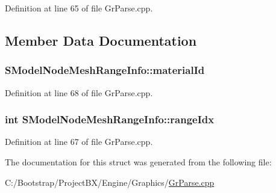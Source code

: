 Definition at line 65 of file GrParse.cpp.

\subsection{Member Data Documentation}
\hypertarget{struct_s_model_node_mesh_range_info_bf16f26b74ad08b098ef75563a1eae90}{
\subsubsection[{materialId}]{ {\bf SModelNodeMeshRangeInfo::materialId}}}
\label{struct_s_model_node_mesh_range_info_bf16f26b74ad08b098ef75563a1eae90}




Definition at line 68 of file GrParse.cpp.\hypertarget{struct_s_model_node_mesh_range_info_1d4582bb5a63563bbf20adf986fd6d04}{
\subsubsection[{rangeIdx}]{\setlength{\rightskip}{0pt plus 5cm}int {\bf SModelNodeMeshRangeInfo::rangeIdx}}}
\label{struct_s_model_node_mesh_range_info_1d4582bb5a63563bbf20adf986fd6d04}




Definition at line 67 of file GrParse.cpp.

The documentation for this struct was generated from the following file:\begin{CompactItemize}
\item 
C:/Bootstrap/ProjectBX/Engine/Graphics/\hyperlink{_gr_parse_8cpp}{GrParse.cpp}\end{CompactItemize}
